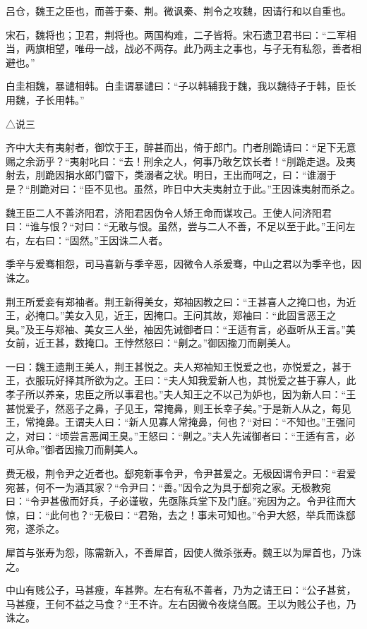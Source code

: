 \documentclass[]{article}
\begin{document}
吕仓，魏王之臣也，而善于秦、荆。微讽秦、荆令之攻魏，因请行和以自重也。

宋石，魏将也；卫君，荆将也。两国构难，二子皆将。宋石遗卫君书曰：``二军相当，两旗相望，唯毋一战，战必不两存。此乃两主之事也，与子无有私怨，善者相避也。''

白圭相魏，暴谴相韩。白圭谓暴谴曰：``子以韩辅我于魏，我以魏待子于韩，臣长用魏，子长用韩。''

△说三

齐中大夫有夷射者，御饮于王，醉甚而出，倚于郎门。门者刖跪请曰：``足下无意赐之余沥乎？``夷射叱曰：``去！刑余之人，何事乃敢乞饮长者！``刖跪走退。及夷射去，刖跪因捐水郎门霤下，类溺者之状。明日，王出而呵之，曰：``谁溺于是？``刖跪对曰：``臣不见也。虽然，昨日中大夫夷射立于此。''王因诛夷射而杀之。

魏王臣二人不善济阳君，济阳君因伪令人矫王命而谋攻己。王使人问济阳君曰：``谁与恨？``对曰：``无敢与恨。虽然，尝与二人不善，不足以至于此。''王问左右，左右曰：``固然。''王因诛二人者。

季辛与爰骞相怨，司马喜新与季辛恶，因微令人杀爰骞，中山之君以为季辛也，因诛之。

荆王所爱妾有郑袖者。荆王新得美女，郑袖因教之曰：``王甚喜人之掩口也，为近王，必掩口。''美女入见，近王，因掩口。王问其故，郑袖曰：``此固言恶王之臭。''及王与郑袖、美女三人坐，袖因先诫御者曰：``王适有言，必亟听从王言。''美女前，近王甚，数掩口。王悖然怒曰：``劓之。''御因揄刀而劓美人。

一曰：魏王遗荆王美人，荆王甚悦之。夫人郑袖知王悦爱之也，亦悦爱之，甚于王，衣服玩好择其所欲为之。王曰：``夫人知我爱新人也，其悦爱之甚于寡人，此孝子所以养亲，忠臣之所以事君也。''夫人知王之不以己为妒也，因为新人曰：``王甚悦爱子，然恶子之鼻，子见王，常掩鼻，则王长幸子矣。''于是新人从之，每见王，常掩鼻。王谓夫人曰：``新人见寡人常掩鼻，何也？``对曰：``不知也。''王强问之，对曰：``顷尝言恶闻王臭。''王怒曰：``劓之。''夫人先诫御者曰：``王适有言，必可从命。''御者因揄刀而劓美人。

费无极，荆令尹之近者也。郄宛新事令尹，令尹甚爱之。无极因谓令尹曰：``君爱宛甚，何不一为酒其家？``令尹曰：``善。''因令之为具于郄宛之家。无极教宛曰：``令尹甚傲而好兵，子必谨敬，先亟陈兵堂下及门庭。''宛因为之。令尹往而大惊，曰：``此何也？``无极曰：``君殆，去之！事未可知也。''令尹大怒，举兵而诛郄宛，遂杀之。

犀首与张寿为怨，陈需新入，不善犀首，因使人微杀张寿。魏王以为犀首也，乃诛之。

中山有贱公子，马甚瘦，车甚弊。左右有私不善者，乃为之请王曰：``公子甚贫，马甚瘦，王何不益之马食？``王不许。左右因微令夜烧刍厩。王以为贱公子也，乃诛之。
\end{document}
